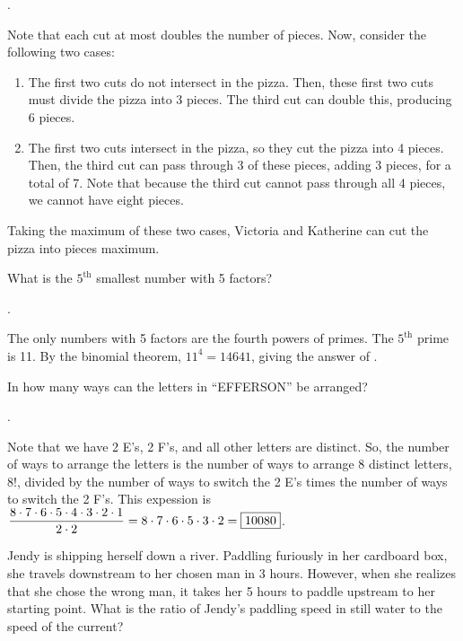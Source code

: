 \documentclass[11pt]{article}
\DeclareRobustCommand{\frac}[3][0pt]{%
  {\begingroup\hspace{#1}#2\hspace{#1}\endgroup\over\hspace{#1}#3\hspace{#1}}}
\begin{document}
.
\begin{solution}
Note that each cut at most doubles the number of pieces. Now, consider the following two cases:
\begin{enumerate}
\item The first two cuts do not intersect in the pizza. Then, these first two cuts must divide the pizza into 3 pieces. The third cut can double this, producing 6 pieces.
\item The first two cuts intersect in the pizza, so they cut the pizza into 4 pieces. Then, the third cut can pass through 3 of these pieces, adding 3 pieces, for a total of 7. Note that because the third cut cannot pass through all 4 pieces, we cannot have eight pieces.
\end{enumerate}
Taking the maximum of these two cases, Victoria and Katherine can cut the pizza into  pieces maximum.
\end{solution}

\begin{problem} What is the  $5^{\text{th}}$ smallest number with 5 factors?
\end{problem}

.
\begin{solution}
The only numbers with 5 factors are the fourth powers of primes. The $5^{\text{th}}$ prime is 11. By the binomial theorem, $11^4 = 14641$, giving the answer of .
\end{solution}

\begin{problem} In how many ways can the letters in ``EFFERSON'' be arranged?
\end{problem}

.
\begin{solution}
Note that we have 2 E's, 2 F's, and all other letters are distinct. So, the number of ways to arrange the letters is the number of ways to arrange 8 distinct letters, 8!, divided by the number of ways to switch the 2 E's times the number of ways to switch the 2 F's. This expession is $\displaystyle \frac{8 \cdot 7 \cdot 6 \cdot 5 \cdot 4 \cdot 3 \cdot 2 \cdot 1}{2 \cdot 2} = 8 \cdot 7 \cdot 6 \cdot 5 \cdot 3 \cdot 2 = \boxed{10080}$.
\end{solution}


\begin{problem}Jendy is shipping herself down a river. Paddling furiously in her cardboard box, she travels downstream to her chosen man in 3 hours. However, when she realizes that she chose the wrong man, it takes her 5 hours to paddle upstream to her starting point. What is the ratio of Jendy's paddling speed in still water to the speed of the current?
\end{problem}
\end{document}

